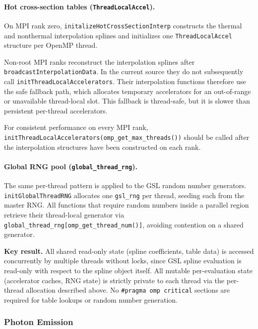\documentclass[12pt,a4paper]{article}
\newcommand{\code}[1]{\texttt{#1}}
\newenvironment{keyresult}{%
	\begin{framed}\noindent\textbf{Key result.}\quad}
	{\end{framed}}
\begin{document}
\paragraph{Hot cross-section tables (\texttt{ThreadLocalAccel}).}
On MPI rank zero, \code{initalizeHotCrossSectionInterp} constructs the
thermal and nonthermal interpolation splines and initializes one
\code{ThreadLocalAccel} structure per OpenMP thread.

Non-root MPI ranks reconstruct the interpolation splines after
\code{broadcastInterpolationData}. In the current source they do not
subsequently call \code{initThreadLocalAccelerators}. Their interpolation
functions therefore use the safe fallback path, which allocates temporary
accelerators for an out-of-range or unavailable thread-local slot. This
fallback is thread-safe, but it is slower than persistent per-thread
accelerators.

For consistent performance on every MPI rank,
\code{initThreadLocalAccelerators(omp\_get\_max\_threads())} should be
called after the interpolation structures have been constructed on each
rank.

\paragraph{Global RNG pool (\texttt{global\_thread\_rng}).}
The same per-thread pattern is applied to the GSL random number generators.
\code{initGlobalThreadRNG} allocates one \code{gsl\_rng} per thread,
seeding each from the master RNG.  All functions that require random numbers
inside a parallel region retrieve their thread-local generator via
\code{global\_thread\_rng[omp\_get\_thread\_num()]}, avoiding contention
on a shared generator.

\begin{keyresult}
	All shared read-only state (spline coefficients, table data) is accessed
	concurrently by multiple threads without locks, since GSL spline evaluation
	is read-only with respect to the spline object itself.  All mutable
	per-evaluation state (accelerator caches, RNG state) is strictly private to
	each thread via the per-thread allocation described above.  No
	\code{\#pragma omp critical} sections are required for table lookups or
	random number generation.
\end{keyresult}

\subsubsection{Photon Emission}
\label{sec:emission}
\end{document}

